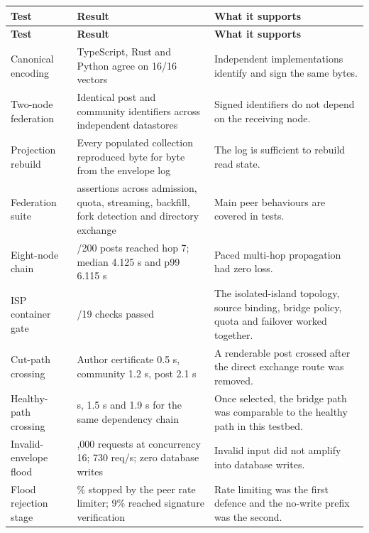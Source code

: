 \documentclass[12pt,a4paper]{article}
\begin{document}
\begin{small}
\begin{longtable}{@{}>{\raggedright\arraybackslash}p{}>{\raggedright\arraybackslash}p{}>{\raggedright\arraybackslash}p{}@{}}
\toprule
\textbf{Test} & \textbf{Result} & \textbf{What it supports} \\
\midrule
\endfirsthead
\toprule
\textbf{Test} & \textbf{Result} & \textbf{What it supports} \\
\midrule
\endhead
\bottomrule
\endfoot
Canonical encoding & TypeScript, Rust and Python agree on 16/16 vectors & Independent implementations identify and sign the same bytes. \\
\addlinespace[2pt]
Two-node federation & Identical post and community identifiers across independent datastores & Signed identifiers do not depend on the receiving node. \\
\addlinespace[2pt]
Projection rebuild & Every populated collection reproduced byte for byte from the envelope log & The log is sufficient to rebuild read state. \\
\addlinespace[2pt]
Federation suite & 31 assertions across admission, quota, streaming, backfill, fork detection and directory exchange & Main peer behaviours are covered in tests. \\
\addlinespace[2pt]
Eight-node chain & 200/200 posts reached hop 7; median 4.125 s and p99 6.115 s & Paced multi-hop propagation had zero loss. \\
\addlinespace[2pt]
ISP container gate & 19/19 checks passed & The isolated-island topology, source binding, bridge policy, quota and failover worked together. \\
\addlinespace[2pt]
Cut-path crossing & Author certificate 0.5 s, community 1.2 s, post 2.1 s & A renderable post crossed after the direct exchange route was removed. \\
\addlinespace[2pt]
Healthy-path crossing & 1.5 s, 1.5 s and 1.9 s for the same dependency chain & Once selected, the bridge path was comparable to the healthy path in this testbed. \\
\addlinespace[2pt]
Invalid-envelope flood & 3,000 requests at concurrency 16; 730 req/s; zero database writes & Invalid input did not amplify into database writes. \\
\addlinespace[2pt]
Flood rejection stage & 90\% stopped by the peer rate limiter; 9\% reached signature verification & Rate limiting was the first defence and the no-write prefix was the second. \\

\end{longtable}
\end{small}
\end{document}
